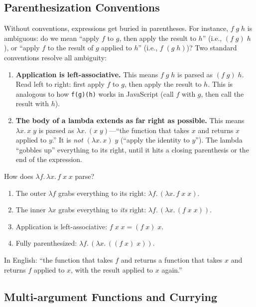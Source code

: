 \documentclass[11pt,a4paper]{article}
\theoremstyle{definition}
\newcommand{\lam}{\lambda}
\begin{document}
\subsection{Parenthesization Conventions}

Without conventions, expressions get buried in parentheses. For instance,
$f\; g\; h$ is ambiguous: do we mean ``apply $f$ to $g$, then apply the result
to $h$'' (i.e., $(f\;g)\;h$), or ``apply $f$ to the result of $g$ applied to
$h$'' (i.e., $f\;(g\;h)$)? Two standard conventions resolve all ambiguity:

\begin{enumerate}[leftmargin=2em]
\item \textbf{Application is left-associative.} This means $f\;g\;h$ is parsed
  as $(f\;g)\;h$. Read left to right: first apply $f$ to $g$, then apply
  the result to $h$. This is analogous to how \texttt{f(g)(h)} works in
  JavaScript (call $f$ with $g$, then call the result with $h$).

\item \textbf{The body of a lambda extends as far right as possible.} This
  means $\lam x.\, x\; y$ is parsed as $\lam x.\,(x\; y)$---``the function
  that takes $x$ and returns $x$ applied to $y$.'' It is \emph{not}
  $(\lam x.\, x)\; y$ (``apply the identity to $y$''). The lambda
  ``gobbles up'' everything to its right, until it hits a closing parenthesis
  or the end of the expression.
\end{enumerate}

\begin{workedexample}
How does $\lam f.\, \lam x.\, f\; x\; x$ parse?
\begin{enumerate}[leftmargin=2em]
\item The outer $\lam f$ grabs everything to its right: $\lam f.\,(\lam x.\, f\; x\; x)$.
\item The inner $\lam x$ grabs everything to \emph{its} right: $\lam f.\,(\lam x.\, (f\; x\; x))$.
\item Application is left-associative: $f\; x\; x = (f\; x)\; x$.
\item Fully parenthesized: $\lam f.\,(\lam x.\, ((f\; x)\; x))$.
\end{enumerate}
In English: ``the function that takes $f$ and returns a function that takes $x$
and returns $f$ applied to $x$, with the result applied to $x$ again.''
\end{workedexample}

\subsection{Multi-argument Functions and Currying}\label{sec:currying}
\end{document}

